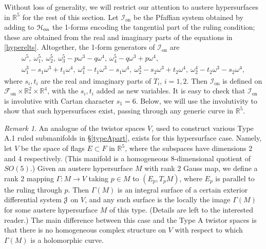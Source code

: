 \documentclass[12pt,reqno]{amsart}
\theoremstyle{definition}
\theoremstyle{remark}
\newtheorem{remark}[theorem]{Remark}
\begin{document}
Without loss of generality, we will restrict our attention to austere hypersurfaces in ${\mathbb R}^5$ for the
rest of this section.  Let ${{{\mathcal I}}_{\operatorname{on}}}$ be the Pfaffian system obtained by adding to ${{{\EuScript H}}_{\operatorname{on}}}$ the
1-forms encoding the tangential part of the ruling condition; these are obtained from the real and imaginary parts
of the equations in \eqref{hyperelts}.  Altogether, the 1-form generators of ${{{\mathcal I}}_{\operatorname{on}}}$ are
\begin{multline*}
{\omega}^5, \ {\omega}^5_1,\  {\omega}^5_2,\  {\omega}^5_3-p{\omega}^3-q{\omega}^4,\  {\omega}^5_4-q{\omega}^3+p{\omega}^4, \\
{\omega}^3_1 - s_1 {\omega}^3 +t_1 {\omega}^4,\  {\omega}^4_1 -t_1 {\omega}^3-s_1 {\omega}^4,\
{\omega}^3_2 - s_2 {\omega}^3 +t_2{\omega}^4,\  {\omega}^4_2 -t_2 {\omega}^3 -s_2{\omega}^4,
\end{multline*}
where $s_i, t_i$ are the real and imaginary parts of $T_i$, $i=1,2$.
Then ${{{\mathcal I}}_{\operatorname{on}}}$ is defined on ${{\mathscr F}_{\operatorname{on}}} \times {\mathbb R}^2_* \times {\mathbb R}^4$, with the $s_i,t_i$ added as new variables.  It is easy to check that ${{{\mathcal I}}_{\operatorname{on}}}$ is involutive
with Cartan character $s_1=6$.  Below, we will use the involutivity to show that such hypersurfaces
exist, passing through any generic curve in ${\mathbb R}^5$.

\begin{remark}  An analogue of the twistor spaces $V$, used to construct various Type A.1 ruled submanifolds in \S\ref{typeApart}, exists for this hypersurface case.  Namely, let $V$ be the space of flags $E\subset F$ in ${\mathbb R}^5$, where the subspaces have dimensions 2 and 4 respectively.
(This manifold is a homogeneous 8-dimensional quotient of $SO(5)$.)
Given an austere hypersurface $M$ with rank 2 Gauss map,
we define a rank 2 mapping $\Gamma:M\to V$ taking $p\in M$ to $(E_p, T_pM)$, where $E_p$ is
parallel to the ruling through $p$.  Then $\Gamma(M)$ is an integral surface
of a certain exterior differential system ${{\EuScript J}}$ on $V$, and any such surface is the locally the image
$\Gamma(M)$ for some austere hypersurface $M$ of this type.  (Details are left to the interested reader.)
The main difference between this case
and the Type A twistor spaces is that there is no homogeneous complex structure on $V$ with respect
to which $\Gamma(M)$ is a holomorphic curve.
\end{remark}
\end{document}
